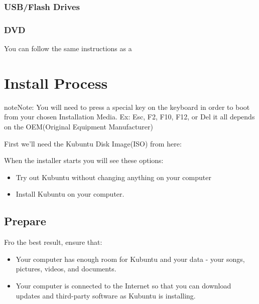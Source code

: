 \documentclass[letterpaper,10pt,english]{sphinxmanual}
\begin{document}
\subsubsection{USB/Flash Drives}
\label{docs/installation:id5}

\subsubsection{DVD}
\label{docs/installation:id6}
You can follow the same instructions as a {\hyperref[docs/installation:kubuntu\string-install\string-link]{}}


\section{Install Process}
\label{docs/installation:install-process}
\begin{notice}{note}{Note:}
You will need to press a special key on the keyboard in order to boot from your chosen Installation Media. Ex: Esc, F2, F10, F12, or Del it all depends on the OEM(Original Equipment Manufacturer)
\end{notice}

First we'll need the Kubuntu Disk Image(ISO) from here: {\hyperref[docs/installation:get\string-kubuntu\string-link]{}}


When the installer starts you will see these options:
\begin{itemize}
\item {} 
Try out Kubuntu without changing anything on your computer

\item {} 
Install Kubuntu on your computer.

\end{itemize}


\subsection{Prepare}
\label{docs/installation:prepare}
Fro the best result, ensure that:
\begin{itemize}
\item {} 
Your computer has enough room for Kubuntu and your data - your songs, pictures, videos, and documents.

\item {} 
Your computer is connected to the Internet so that you can download updates and third-party software as Kubuntu is installing.

\end{itemize}
\end{document}
